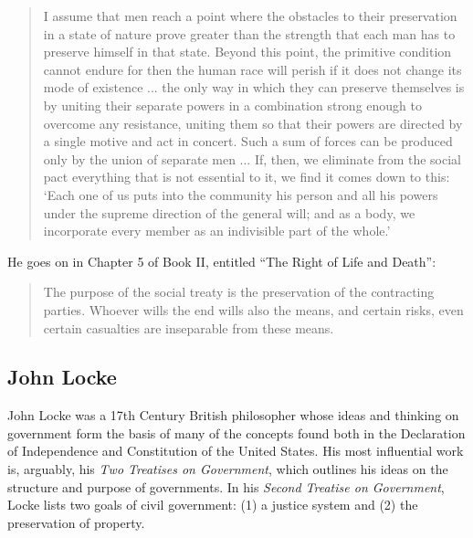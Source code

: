 \begin{quote}

I assume that men reach a point where the obstacles to their preservation in a state of nature prove greater than the strength that each man has to preserve himself in that state.  Beyond this point, the primitive condition cannot endure for then the human race will perish if it does not change its mode of existence ... the only way in which they can preserve themselves is by uniting their separate powers in a combination strong enough to overcome any resistance, uniting them so that their powers are directed by a single motive and act in concert.  Such a sum of forces can be produced only by the union of separate men ... If, then, we eliminate from the social pact everything that is not essential to it, we find it comes down to this: `Each one of us puts into the community his person and all his powers under the supreme direction of the general will; and as a body, we incorporate every member as an indivisible part of the whole.'

\end{quote}

He goes on in Chapter 5 of Book II, entitled ``The Right of Life and Death'':

\begin{quote}
The purpose of the social treaty is the preservation of the contracting parties.  Whoever wills the end wills also the means, and certain risks, even certain casualties are inseparable from these means.
\end{quote}

\subsection{John Locke}
John Locke was a 17th Century British philosopher whose ideas and thinking on government form the basis of many of the concepts found both in the Declaration of Independence and Constitution of the United States.  His most influential work is, arguably, his \textit{Two Treatises on Government}, which outlines his ideas on the structure and purpose of governments.  In his \textit{Second Treatise on Government}, Locke lists two goals of civil government: (1) a justice system and (2) the preservation of property.

